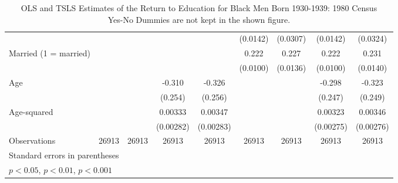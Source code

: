 \documentclass{article}
\begin{document}
\begin{landscape}
\begin{table}[htbp]
\begin{tabular}{l*{8}{c}}
                         &                     &                     &                     &                     &    (0.0142)         &    (0.0307)         &    (0.0142)         &    (0.0324)         \\
[1em]
Married (1 = married)    &                     &                     &                     &                     &       0.222\sym{***}&       0.227\sym{***}&       0.222\sym{***}&       0.231\sym{***}\\
                         &                     &                     &                     &                     &    (0.0100)         &    (0.0136)         &    (0.0100)         &    (0.0140)         \\
[1em]
Age                      &                     &                     &      -0.310         &      -0.326         &                     &                     &      -0.298         &      -0.323         \\
                         &                     &                     &     (0.254)         &     (0.256)         &                     &                     &     (0.247)         &     (0.249)         \\
[1em]
Age-squared              &                     &                     &     0.00333         &     0.00347         &                     &                     &     0.00323         &     0.00346         \\
                         &                     &                     &   (0.00282)         &   (0.00283)         &                     &                     &   (0.00275)         &   (0.00276)         \\
\hline
Observations             &       26913         &       26913         &       26913         &       26913         &       26913         &       26913         &       26913         &       26913         \\
\hline\hline
\multicolumn{9}{l}{\footnotesize Standard errors in parentheses}\\
\multicolumn{9}{l}{\footnotesize \sym{*} \(p<0.05\), \sym{**} \(p<0.01\), \sym{***} \(p<0.001\)}\\
\end{tabular}
\caption[caption]{OLS and TSLS Estimates of the Return to Education for Black Men Born 1930-1939: 1980 Census \\\hspace{\textwidth}  Yes-No Dummies are not kept in the shown figure.}
\end{table}
\end{landscape}
\end{document}
